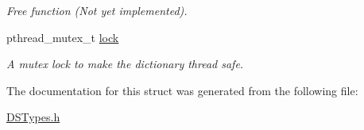 \begin{DoxyCompactItemize}
\begin{DoxyCompactList}\small\item\em Free function (Not yet implemented). \item\end{DoxyCompactList}\item 
\hypertarget{struct_d_s_dictionary_a0abaf4b5d42c4e5d19190035fade3599}{
pthread\_\-mutex\_\-t \hyperlink{struct_d_s_dictionary_a0abaf4b5d42c4e5d19190035fade3599}{lock}}
\label{struct_d_s_dictionary_a0abaf4b5d42c4e5d19190035fade3599}

\begin{DoxyCompactList}\small\item\em A mutex lock to make the dictionary thread safe. \item\end{DoxyCompactList}\end{DoxyCompactItemize}


The documentation for this struct was generated from the following file:\begin{DoxyCompactItemize}
\item 
\hyperlink{_d_s_types_8h}{DSTypes.h}\end{DoxyCompactItemize}
